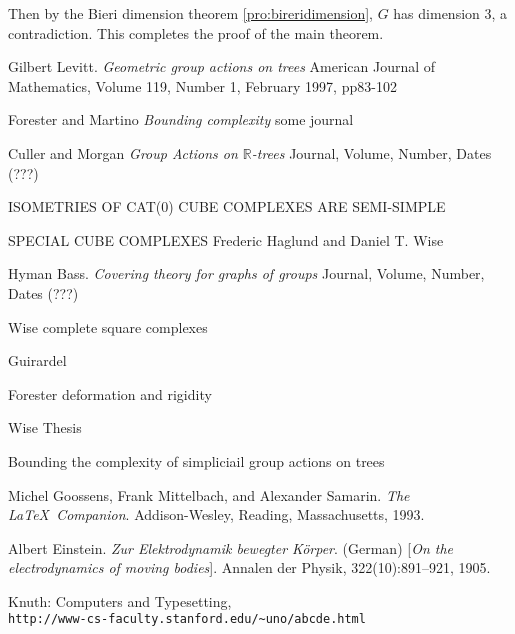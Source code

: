 \documentclass[12pt,parskip=full]{report}
\theoremstyle{plain}
\theoremstyle{definition}
\begin{document}
Then by the Bieri dimension theorem \ref{pro:bireridimension}, \(G\) has dimension 3, a contradiction. This completes the proof of the main theorem.



\noindent

\cleardoublepage








\begin{thebibliography}{9}


Gilbert Levitt.
\textit{Geometric group actions on trees}
American Journal of Mathematics, Volume 119, Number 1, February 1997, pp83-102

Forester and Martino
\textit{Bounding complexity}
some journal

Culler and Morgan
\textit{Group Actions on $\mathbb{R}$-trees}
Journal, Volume, Number, Dates (???)

ISOMETRIES OF CAT(0) CUBE COMPLEXES ARE SEMI-SIMPLE

SPECIAL CUBE COMPLEXES
Frederic Haglund and Daniel T. Wise

Hyman Bass.
\textit{Covering theory for graphs of groups}
Journal, Volume, Number, Dates (???)


Wise complete square complexes

Guirardel

Forester deformation and rigidity

Wise Thesis

Bounding the complexity of simpliciail group actions
on trees 


Michel Goossens, Frank Mittelbach, and Alexander Samarin. 
\textit{The \LaTeX\ Companion}. 
Addison-Wesley, Reading, Massachusetts, 1993.

Albert Einstein. 
\textit{Zur Elektrodynamik bewegter K{\"o}rper}. (German) 
[\textit{On the electrodynamics of moving bodies}]. 
Annalen der Physik, 322(10):891–921, 1905.

Knuth: Computers and Typesetting,
\\\texttt{http://www-cs-faculty.stanford.edu/\~{}uno/abcde.html}

\end{thebibliography}



\end{document}
